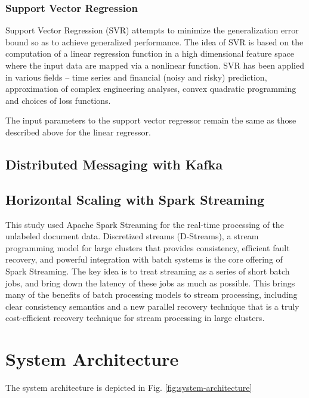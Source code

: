 \documentclass[conference]{IEEEtran}
\begin{document}
\subsubsection{Support Vector Regression}
Support Vector Regression (SVR) attempts to minimize the generalization error bound so as to achieve generalized performance. The idea of SVR is based on the computation of a linear regression function in a high dimensional feature space where the input data are mapped via a nonlinear function. SVR has been applied in various fields – time series and financial (noisy and risky) prediction, approximation of complex engineering analyses, convex quadratic programming and choices of loss functions\cite{basak2007support}.

The input parameters to the support vector regressor remain the same as those described above for the linear regressor.


\subsection{Distributed Messaging with Kafka}


\subsection{Horizontal Scaling with Spark Streaming}
This study used Apache Spark Streaming for the real-time processing of the unlabeled document data. Discretized streams (D-Streams), a stream programming model for large clusters that provides consistency, efficient fault recovery, and powerful integration with batch systems is the core offering of Spark Streaming. The key idea is to treat streaming as a series of short batch jobs, and bring down the latency of these jobs as much as possible. This brings many of the benefits of batch processing models to stream processing, including clear consistency semantics and a new parallel recovery technique that is a truly cost-efficient recovery technique for stream processing in large clusters\cite{zaharia2012discretized}.

\section{System Architecture}
The system architecture is depicted in Fig. \ref{fig:system-architecture}
\end{document}
